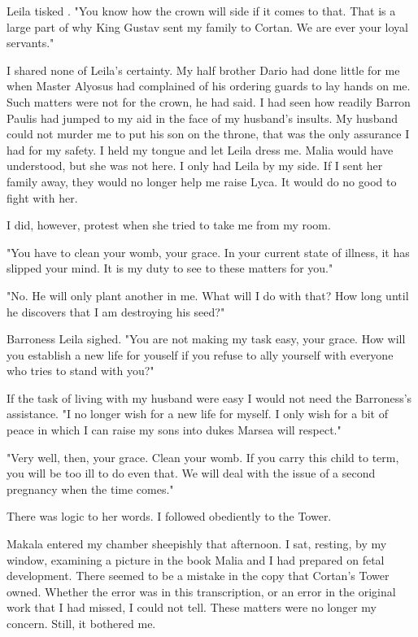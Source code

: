 \documentclass{article}
\begin{document}
Leila tisked . "You know how the crown will side if it comes to that. That is a large part of why King Gustav sent my family to Cortan. We are ever your loyal servants." 

I shared none of Leila's certainty. My half brother Dario had done little for me when Master Alyosus had complained of his ordering guards to lay hands on me. Such matters were not for the crown, he had said. I had seen how readily Barron Paulis had jumped to my aid in the face of my husband's insults. My husband could not murder me to put his son on the throne, that was the only assurance I had for my safety. I held my tongue and let Leila dress me. Malia would have understood, but she was not here. I only had Leila by my side. If I sent her family away, they would no longer help me raise Lyca. It would do no good to fight with her. 

I did, however, protest when she tried to take me from my room. 

"You have to clean your womb, your grace. In your current state of illness, it has slipped your mind. It is my duty to see to these matters for you."

"No. He will only plant another in me. What will I do with that? How long until he discovers that I am destroying his seed?"

Barroness Leila sighed. "You are not making my task easy, your grace. How will you establish a new life for youself if you refuse to ally yourself with everyone who tries to stand with you?"

If the task of living with my husband were easy I would not need the Barroness's assistance. "I no longer wish for a new life for myself. I only wish for a bit of peace in which I can raise my sons into dukes Marsea will respect." 

"Very well, then, your grace. Clean your womb. If you carry this child to term, you will be too ill to do even that. We will deal with the issue of a second pregnancy when the time comes."

There was logic to her words. I followed obediently to the Tower.

\vspace{.5cm}

Makala entered my chamber sheepishly that afternoon. I sat, resting, by my window, examining a picture in the book Malia and I had prepared on fetal development. There seemed to be a mistake in the copy that Cortan's Tower owned. Whether the error was in this transcription, or an error in the original work that I had missed, I could not tell. These matters were no longer my concern. Still, it bothered me.
\end{document}
